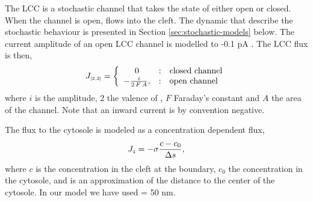 The LCC is a stochastic channel that takes the state of either open or closed. When the channel is open, \Ca flows into the cleft. The dynamic that describe the stochastic behaviour is presented in Section \ref{sec:stochastic-models} below. The current amplitude of an open LCC channel is modelled to -0.1 pA \cite{GuiaSternLakattaEtAl2001}. The LCC flux is then,
\begin{equation}
\label{eq:constant-current-flux}
J_{\scriptscriptstyle[2,3]}= \left\{
  \begin{array}{c@{\quad:\quad}l}
    0& \text{closed channel}\\
    - \frac{i}{2\,F\,A},& \text{open channel}
  \end{array}
\right.
\end{equation}
\noindent where $i$ is the amplitude, 2 the valence of \Ca, $F$ Faraday's constant and $A$ the area of the channel. Note that an inward current is by convention negative.\par
The flux to the cytosole is modeled as a concentration dependent flux,
\begin{equation}
  \label{eq:conc-dependent-flux}
  J_{\scriptscriptstyle 4}= -\sigma\frac{c - c_0}{\Delta{}s},
\end{equation}
where $c$ is the concentration in the cleft at the boundary, $c_0$ the concentration in the cytosole, and \Ds is an approximation of the distance to the center of the cytosole. In our model we have used \Ds = 50 nm.\par

